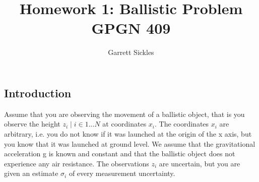 \documentclass[12pt,runningheads]{article}
\begin{document}

\title{Homework 1: Ballistic Problem\\GPGN 409}
\author{Garrett Sickles}
\maketitle
\subsection*{Introduction}
Assume that you are observing the movement of a ballistic object, that is you observe the height $z_{i} \mid i \in 1 . . . N$ at coordinates $x_{i}$. The coordinates $x_{i}$ are arbitrary, i.e. you do not know if it was launched at the origin of the x axis, but you know that it was launched at ground level. We assume that the gravitational acceleration g is known and constant and that the ballistic object does not experience any air resistance. The observations $z_{i}$ are uncertain, but you are given an estimate $\sigma_{i}$ of every measurement uncertainty.
\end{document}
